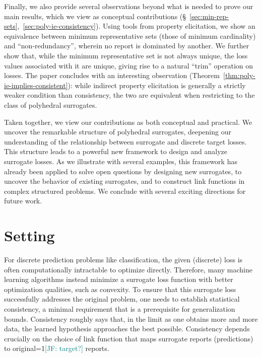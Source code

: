 \documentclass[11pt]{article}
\newcommand{\Comments}{1}
\newcommand{\mynote}[2]{\ifnum\Comments=1\textcolor{#1}{#2}\fi}
\newcommand{\jessie}[1]{\mynote{teal}{[JF: #1]}}
\begin{document}
Finally, we also provide several observations beyond what is needed to prove our main results, which we view as conceptual contributions (\S~\ref{sec:min-rep-sets},~\ref{sec:poly-ie-consistency}).
Using tools from property elicitation, we show an equivalence between minimum representative sets (those of minimum cardinality) and ``non-redundancy'', wherein no report is dominated by another.
We further show that, while the minimum representative set is not always unique, the loss values associated with it are unique, giving rise to a natural ``trim'' operation on losses.
The paper concludes with an interesting observation (Theorem~\ref{thm:poly-ie-implies-consistent}): while indirect property elicitation is generally a strictly weaker condition than consistency, the two are equivalent when restricting to the class of polyhedral surrogates.

Taken together, we view our contributions as both conceptual and practical.
We uncover the remarkable structure of polyhedral surrogates, deepening our understanding of the relationship between surrogate and discrete target losses.
This structure leads to a powerful new framework to design and analyze surrogate losses.
As we illustrate with several examples, this framework has already been applied to solve open questions by designing new surrogates, to uncover the behavior of existing surrogates, and to construct link functions in complex structured problems.
We conclude with several exciting directions for future work.





\section{Setting}
\label{sec:setting}

For discrete prediction problems like classification, the given (discrete) loss is often computationally intractable to optimize directly.
Therefore, many machine learning algorithms instead minimize a surrogate loss function with better optimization qualities, such as convexity.
To ensure that this surrogate loss successfully addresses the original problem, one needs to establish statistical consistency, a minimal requirement that is a prerequisite for generalization bounds.
Consistency roughly says that, in the limit as one obtains more and more data, the learned hypothesis approaches the best possible.
Consistency depends crucially on the choice of link function that maps surrogate reports (predictions) to original\jessie{target?} reports.
\end{document}
